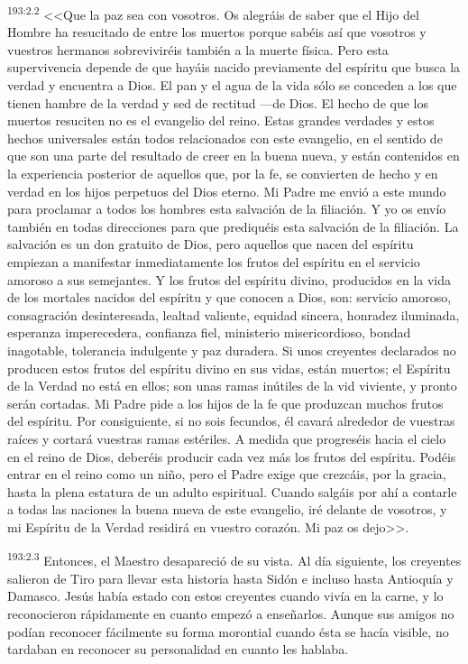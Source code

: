 \par 
\textsuperscript{193:2.2} <<Que la paz sea con vosotros. Os alegráis de saber que el Hijo del Hombre ha resucitado de entre los muertos porque sabéis así que vosotros y vuestros hermanos sobreviviréis también a la muerte física. Pero esta supervivencia depende de que hayáis nacido previamente del espíritu que busca la verdad y encuentra a Dios. El pan y el agua de la vida sólo se conceden a los que tienen hambre de la verdad y sed de rectitud ---de Dios. El hecho de que los muertos resuciten no es el evangelio del reino. Estas grandes verdades y estos hechos universales están todos relacionados con este evangelio, en el sentido de que son una parte del resultado de creer en la buena nueva, y están contenidos en la experiencia posterior de aquellos que, por la fe, se convierten de hecho y en verdad en los hijos perpetuos del Dios eterno. Mi Padre me envió a este mundo para proclamar a todos los hombres esta salvación de la filiación. Y yo os envío también en todas direcciones para que prediquéis esta salvación de la filiación. La salvación es un don gratuito de Dios, pero aquellos que nacen del espíritu empiezan a manifestar inmediatamente los frutos del espíritu en el servicio amoroso a sus semejantes. Y los frutos del espíritu divino, producidos en la vida de los mortales nacidos del espíritu y que conocen a Dios, son: servicio amoroso, consagración desinteresada, lealtad valiente, equidad sincera, honradez iluminada, esperanza imperecedera, confianza fiel, ministerio misericordioso, bondad inagotable, tolerancia indulgente y paz duradera. Si unos creyentes declarados no producen estos frutos del espíritu divino en sus vidas, están muertos; el Espíritu de la Verdad no está en ellos; son unas ramas inútiles de la vid viviente, y pronto serán cortadas. Mi Padre pide a los hijos de la fe que produzcan muchos frutos del espíritu. Por consiguiente, si no sois fecundos, él cavará alrededor de vuestras raíces y cortará vuestras ramas estériles. A medida que progreséis hacia el cielo en el reino de Dios, deberéis producir cada vez más los frutos del espíritu. Podéis entrar en el reino como un niño, pero el Padre exige que crezcáis, por la gracia, hasta la plena estatura de un adulto espiritual. Cuando salgáis por ahí a contarle a todas las naciones la buena nueva de este evangelio, iré delante de vosotros, y mi Espíritu de la Verdad residirá en vuestro corazón. Mi paz os dejo>>.

\par 
\textsuperscript{193:2.3} Entonces, el Maestro desapareció de su vista. Al día siguiente, los creyentes salieron de Tiro para llevar esta historia hasta Sidón e incluso hasta Antioquía y Damasco. Jesús había estado con estos creyentes cuando vivía en la carne, y lo reconocieron rápidamente en cuanto empezó a enseñarlos. Aunque sus amigos no podían reconocer fácilmente su forma morontial cuando ésta se hacía visible, no tardaban en reconocer su personalidad en cuanto les hablaba.

